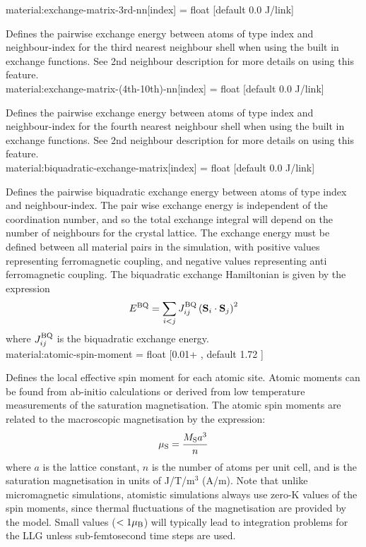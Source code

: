 {\zicf material:exchange-matrix-3rd-nn[index] = float [default 0.0 J/link]}
 Defines the
pairwise exchange energy between atoms of type index and neighbour-index for the
third nearest neighbour shell when using the built in exchange functions. See
2nd neighbour description for more details on using this feature.\\

{\zicf material:exchange-matrix-(4th-10th)-nn[index] = float [default 0.0 J/link]}
Defines the pairwise exchange energy between atoms of type index and
neighbour-index for the fourth nearest neighbour shell when using the built in
exchange functions. See 2nd neighbour description for more details on using this feature.\\

{\zicf material:biquadratic-exchange-matrix[index] = float [default 0.0 J/link]}
Defines the pairwise biquadratic exchange energy between atoms of type index
and neighbour-index. The pair wise exchange energy is independent of the
coordination number, and so the total exchange integral will depend on the
number of neighbours for the crystal lattice. The exchange energy must be defined
between all material pairs in the simulation, with positive values representing
ferromagnetic coupling, and negative values representing anti ferromagnetic
coupling. The biquadratic exchange Hamiltonian is given by the expression
\begin{equation*}
E^{\mathrm{BQ}} = \sum_{i<j} J_{ij}^{\mathrm{BQ}} \left( \mathbf{S}_i \cdot \mathbf{S}_j \right)^2
\end{equation*}
where $J_{ij}^{\mathrm{BQ}}$ is the biquadratic exchange energy. \\


{\zicf material:atomic-spin-moment = float [0.01+ \muB, default 1.72 \muB]}
Defines the local effective spin moment for each atomic site. Atomic moments can be found from ab-initio calculations or derived from low temperature measurements of the saturation magnetisation. The atomic spin moments are related to the macroscopic magnetisation by the expression:
\begin{equation*}
\mu_\mathrm{S} = \frac{M_\mathrm{S} a^3}{n}
\end{equation*}
where $a$ is the lattice constant, $n$ is the number of atoms per unit cell, and \Ms is the saturation magnetisation in units of J/T/m$^3$ (A/m). Note that unlike micromagnetic simulations, atomistic simulations always use zero-K values of the spin moments, since thermal fluctuations of the magnetisation are provided by the model. Small values ($<1 \mu_\mathrm{B}$) will typically lead to integration problems for the LLG unless sub-femtosecond time steps are used.\\

